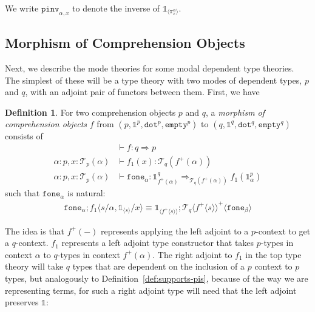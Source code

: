 \documentclass[10pt]{article}
\newtheorem{lemma}{Lemma}
\theoremstyle{definition}
\newtheorem{definition}{Definition}
\newcommand{\yields}{\vdash}
\newcommand{\tcell}{\Rightarrow}
\newcommand\TrPlus[2]{\ensuremath{{#1}^+(#2)}}
\newcommand\El[2]{\mathcal{T}_{#1}(#2)}
\newcommand\ApEl[2]{\mathcal{T}_{#1}\langle#2\rangle}
\newcommand\ap[2]{\ensuremath{#1 \langle #2 \rangle }}
\newcommand\ApPlus[2]{\ensuremath{{#1}^+ \langle #2 \rangle }}
\newcommand{\tdot}{\ensuremath{\mathtt{dot}}}
\newcommand{\tempty}{\ensuremath{\mathtt{empty}}}
\newcommand\One{\ensuremath{\mathds{1}}}
\newcommand\ApOne[1]{\ensuremath{\One_{\langle {#1} \rangle }}}
\newcommand\pinv[1]{\ensuremath{\mathtt{pinv}_{#1}}}
\newcommand\fone[1]{\ensuremath{\mathtt{fone}_{#1}}}
\begin{document}
We write $\pinv{\alpha,x}$ to denote the inverse of $\ApOne{\pi^\alpha_x}$.



\subsection{Morphism of Comprehension Objects}

Next, we describe the mode theories for some modal dependent type
theories.  The simplest of these will be a type theory with two modes of
dependent types, $p$ and $q$, with an adjoint pair of functors between
them.  First, we have

\begin{definition}\label{def:morphism-comprehension-object}
For two comprehension objects $p$ and $q$,
a \emph{morphism of comprehension objects} $f$ from $(p, \One^p, \tdot^p, \tempty^p)$ to $(q, \One^q, \tdot^q, \tempty^q)$ consists of 
\begin{align*}
&\yields f : q \tcell p \\
\alpha : p, x : \El{p}{\alpha} &\yields f_1(x) : \El{q}{\TrPlus{f}{\alpha}} \\
\alpha : p, x : \El{p}{\alpha} &\yields \fone{\alpha} : \One^q_{\TrPlus{f}{\alpha}}  \tcell_{\El{q}{\TrPlus{f}{\alpha}}} f_1(\One^p_\alpha)
\end{align*}
such that $\fone{\alpha}$ is natural:
\begin{align}
\fone{\alpha};\ap{f_1}{s/\alpha, \ApOne{s}/x} \equiv \ApOne{\ApPlus{f}{s}};\ApPlus{\ApEl{q}{\ApPlus{f}{s}}}{\fone{\beta}}
\end{align}
\end{definition}

The idea is that $\TrPlus{f}{-}$ represents applying the left adjoint to
a $p$-context to get a $q$-context.  $f_1$ represents a left adjoint
type constructor that takes $p$-types in context $\alpha$ to $q$-types
in context $\TrPlus{f}\alpha$.  The right adjoint to $f_1$ in the top
type theory will take $q$ types that are dependent on the inclusion of a
$p$ context to $p$ types, but analogously to
Definition~\ref{def:supports-pis}, because of the way we are
representing terms, for such a right adjoint type will need that the
left adjoint preserves $\One$:
\end{document}
